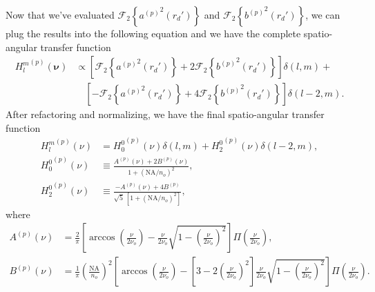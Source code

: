 \documentclass[11pt]{article}
\providecommand{\bs}[1]{\boldsymbol{#1}}
\begin{document}
Now that we've evaluated $\mathcal{F}_2\left\{{a^{(p)}}^2(r_d')\right\}$ and $\mathcal{F}_2\left\{{b^{(p)}}^2(r_d')\right\}$, we can plug the results into the following equation and we have the complete spatio-angular transfer function
\begin{align}
  {H_l^m}^{(p)}(\bs{\nu}) &\propto \left[\mathcal{F}_2\left\{{a^{(p)}}^2(r_d')\right\} + 2\mathcal{F}_2\left\{{b^{(p)}}^2(r_d')\right\}\right]\delta(l, m) + \\&\hspace{1em}\left[-\mathcal{F}_2\left\{{a^{(p)}}^2(r_d')\right\} + 4\mathcal{F}_2\left\{{b^{(p)}}^2(r_d')\right\}\right]\delta(l-2, m).
\end{align}
After refactoring and normalizing, we have the final spatio-angular transfer function
\begin{align}
  {H_l^m}^{(p)}(\nu) &= {H_0^0}^{(p)}(\nu)\delta(l, m) + {H_2^0}^{(p)}(\nu)\delta(l-2, m),\\
  {H_0^0}^{(p)}(\nu) &\equiv \frac{A^{(p)}(\nu) + 2B^{(p)}(\nu)}{1 + (\text{NA}/n_o)^2},\\
  {H_2^0}^{(p)}(\nu) &\equiv \frac{-A^{(p)}(\nu) + 4B^{(p)}}{\sqrt{5}\, [1 + (\text{NA}/n_o)^2]},
\end{align}
where
\begin{align}
  {A}^{(p)}(\nu) &= \frac{2}{\pi}\left[\arccos\left(\frac{\nu}{2\nu_o}\right) - \frac{\nu}{2\nu_o}\sqrt{1 - \left(\frac{\nu}{2\nu_o}\right)^2}\right]\Pi\left(\frac{\nu}{2\nu_o}\right),\\
  B^{(p)}(\nu) &= \frac{1}{\pi}\left(\frac{\text{NA}}{n_o}\right)^2\left[\arccos\left(\frac{\nu}{2\nu_o}\right) - \left[3 - 2\left(\frac{\nu}{2\nu_o}\right)^2\right]\frac{\nu}{2\nu_o} \sqrt{1 - \left(\frac{\nu}{2\nu_o}\right)^2}\right]\Pi\left(\frac{\nu}{2\nu_o}\right).                 
\end{align}
\end{document}
